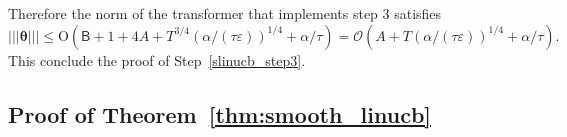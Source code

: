 \documentclass[10pt]{article}
\newcommand{\eps}{\varepsilon}
\renewcommand{\cO}{\mathcal{O}}
\newcommand{\<}{\left\langle}
\renewcommand{\>}{\right\rangle}
\newcommand{\nrmp}[1]{{\left|\!\left|\!\left|{#1}\right|\!\right|\!\right|}}
\newcommand{\temp}{{\tau}}
\newcommand{\cwid}{{\alpha}}
\newcommand{\tfthres}{{\mathsf{B}}}
\newcommand{\conO}{{\mathrm{O}}}
\def\btheta{{\boldsymbol \theta}}
\begin{document}
 Therefore the norm of the transformer that implements step 3 satisfies $$
 \nrmp{\btheta}\leq \conO(\tfthres+1+4A+T^{3/4}({\alpha/(\temp\eps)})^{1/4}+\cwid/\temp)=
 \cO(A+T({\alpha/(\temp\eps)})^{1/4}+\alpha/\temp).$$  This conclude the proof of Step~\ref{slinucb_step3}.


















































\subsection{Proof of Theorem~\ref{thm:smooth_linucb}}\label{sec:pf_thm:smooth_linucb}
\end{document}
